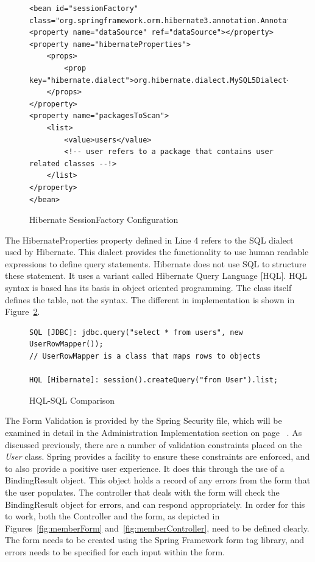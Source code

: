 \begin{figure}[H]
\begin{lstlisting}
<bean id="sessionFactory"
class="org.springframework.orm.hibernate3.annotation.AnnotationSessionFactoryBean">
<property name="dataSource" ref="dataSource"></property>
<property name="hibernateProperties">
	<props>
		<prop key="hibernate.dialect">org.hibernate.dialect.MySQL5Dialect</prop>
	</props>
</property>
<property name="packagesToScan">
	<list>
		<value>users</value> 
		<!-- user refers to a package that contains user related classes --!>
	</list>
</property>
</bean>
\end{lstlisting}
\caption{Hibernate SessionFactory Configuration}
\label{fig:hibernateConfig}
\end{figure}

The HibernateProperties property defined in Line 4 refers to the SQL dialect used by Hibernate. This dialect provides the functionality to use human readable expressions to define query statements. Hibernate does not use SQL to structure these statement. It uses a variant called Hibernate Query Language [HQL]. HQL syntax is based has its basis in object oriented programming. The class itself defines the table, not the syntax. The different in implementation is shown in Figure~\ref{fig:hqlsql}.

\begin{figure}[H]
\begin{lstlisting}
SQL [JDBC]: jdbc.query("select * from users", new UserRowMapper());
// UserRowMapper is a class that maps rows to objects

HQL [Hibernate]: session().createQuery("from User").list;
\end{lstlisting}
\caption{HQL-SQL Comparison}
\label{fig:hqlsql}
\end{figure}
 
The Form Validation is provided by the Spring Security file, which will be examined in detail in the Administration Implementation section on page ~\pageref{sec:adminImp}. As discussed previously, there are a number of validation constraints placed on the \textit{User} class. Spring provides a facility to ensure these constraints are enforced, and to also provide a positive user experience. It does this through the use of a BindingResult object. This object holds a record of any errors from the form that the user populates. The controller that deals with the form will check the BindingResult object for errors, and can respond appropriately. In order for this to work, both the Controller and the form, as depicted in Figures~\ref{fig:memberForm} and~\ref{fig:memberController}, need to be defined clearly. The form needs to be created  using the Spring Framework form tag library, and errors needs to be specified for each input within the form. 


